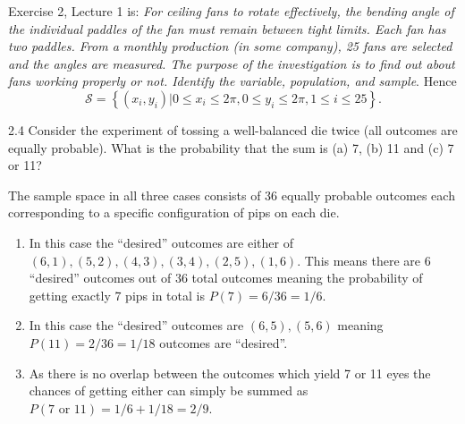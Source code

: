 \begin{derivation}
  Exercise 2, Lecture 1 is:
  \textit{For ceiling fans to rotate effectively, the bending angle of the individual paddles of the fan must remain between tight limits. Each fan has two paddles. From a monthly production (in some company), 25 fans are selected and the angles are measured. The purpose of the investigation is to find out about fans working properly or not. Identify the variable, population, and sample}.
  Hence
  \begin{equation*}
    \mathcal{S} = \left\{ (x_i, y_i) | 0 \leq x_i \leq 2\pi, 0 \leq y_i \leq 2\pi, 1 \leq i \leq 25 \right\}
  .\end{equation*}
\end{derivation}



\begin{problem}{2.4}
  Consider the experiment of tossing a well-balanced die twice (all outcomes are equally probable).
  What is the probability that the sum is (a) 7, (b) 11 and (c) 7 or 11?
\end{problem}

\begin{derivation}
  The sample space in all three cases consists of 36 equally probable outcomes each corresponding to a specific configuration of pips on each die.
  \begin{enumerate}[label=(\alph*)]
    \item In this case the ``desired'' outcomes are either of $(6,1), (5,2), (4,3), (3,4), (2,5), (1,6)$.
      This means there are 6 ``desired'' outcomes out of 36 total outcomes meaning the probability of getting exactly 7 pips in total is $P(7) = 6 / 36 = 1 / 6$.
    \item In this case the ``desired'' outcomes are $(6,5), (5,6)$ meaning $P(11) = 2 / 36 = 1 / 18$ outcomes are ``desired''.
    \item As there is no overlap between the outcomes which yield 7 or 11 eyes the chances of getting either can simply be summed as $P(7 \text{ or } 11) = 1 / 6 + 1 / 18 = 2 / 9$.
  \end{enumerate}
\end{derivation}


